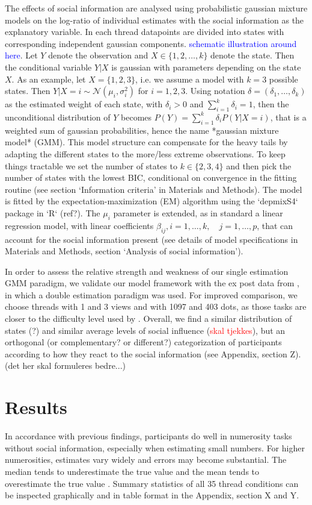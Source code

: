 \documentclass[9pt,twocolumn,twoside,lineno]{pnas-new}
\begin{document}
The effects of social information are analysed using probabilistic gaussian mixture models on the log-ratio of individual estimates with the social information as the explanatory variable. In each thread datapoints are divided into states with corresponding independent gaussian components. \textcolor{blue}{schematic illustration around here}. Let $Y$ denote the observation and $X\in\{1,2,\dots,k\}$ denote the state. Then the conditional variable $Y|X$ is gaussian with parameters depending on the state $X$. As an example, let $X=\{1,2,3\}$, i.e. we assume a model with $k=3$ possible states. Then $Y|X=i \sim \mathcal{N}(\mu_i,\sigma_i^2)$ for $i=1,2,3$. Using notation $\delta = (\delta_1,\dots,\delta_k)$ as the estimated weight of each state, with $\delta_i >0$ and $\sum_{i=1}^k\delta_i = 1$, then the unconditional distribution of $Y$ becomes $P(Y) = \sum_{i=1}^k \delta_i P(Y|X=i)$, that is a weighted sum of gaussian probabilities, hence the name *gaussian mixture model* (GMM). This model structure can compensate for the heavy tails by adapting the different states to the more/less extreme observations.  To keep things tractable we set the number of states to $k\in\{2,3,4\}$ and then pick the number of states with the lowest BIC, conditional on convergence in the fitting routine (see section `Information criteria' in Materials and Methods). The model is fitted by the expectation-maximization (EM) algorithm using the `depmixS4` package in `R` (ref?). The $\mu_i$ parameter is extended, as in standard a linear regression model, with linear coefficients $\beta_{ij}, i=1,\dots,k, \quad j=1,\dots,p$, that can account for the social information present (see details of model specifications in Materials and Methods, section `Analysis of social information').

In order to assess the relative strength and weakness of our single estimation GMM paradigm, we validate our model framework with the ex post data from \citet{jayles2017social}, in which a double estimation paradigm was used. For improved comparison, we choose threads with 1 and 3 views and with 1097 and 403 dots, as those tasks are closer to the difficulty level used by \citet{jayles2017social}. Overall, we find a similar distribution of states (?) and similar average levels of social influence (\textcolor{red}{skal tjekkes}), but an orthogonal (or complementary? or different?) categorization of participants according to how they react to the social information (see Appendix, section Z). (det her skal formuleres bedre...)

\section*{Results}
In accordance with previous findings, participants do well in numerosity tasks without social information, especially when estimating small numbers. For higher numerosities, estimates vary widely and errors may become substantial. The median tends to underestimate the true value and the mean tends to overestimate the true value \cite{indow1977scaling, izard2008calibrating, krueger1982single, krueger1984perceived, kao2018counteracting}. Summary statistics of all 35 thread conditions can be inspected graphically and in table format in the Appendix, section X and Y.
\end{document}
